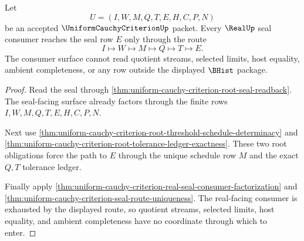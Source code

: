 \begin{theorem}
\label{thm:uniform-cauchy-criterion-root-seal-consumer-nonescape}
Let
$$
U=(I,W,M,Q,T,E,H,C,P,N)
$$
be an accepted $\UniformCauchyCriterionUp$ packet. Every $\RealUp$ seal consumer reaches the seal row $E$ only through the route
$$
I \longmapsto W \longmapsto M \longmapsto Q \longmapsto T \longmapsto E.
$$
The consumer surface cannot read quotient streams, selected limits, host equality, ambient completeness, or any row outside the displayed $\BHist$ package.
\end{theorem}
\begin{proof}
Read the seal through \autoref{thm:uniform-cauchy-criterion-root-seal-readback}. The seal-facing surface already factors through the finite rows $I,W,M,Q,T,E,H,C,P,N$.

Next use \autoref{thm:uniform-cauchy-criterion-root-threshold-schedule-determinacy} and \autoref{thm:uniform-cauchy-criterion-root-tolerance-ledger-exactness}. These two root obligations force the path to $E$ through the unique schedule row $M$ and the exact $Q,T$ tolerance ledger.

Finally apply \autoref{thm:uniform-cauchy-criterion-real-seal-consumer-factorization} and \autoref{thm:uniform-cauchy-criterion-seal-route-uniqueness}. The real-facing consumer is exhausted by the displayed route, so quotient streams, selected limits, host equality, and ambient completeness have no coordinate through which to enter.
\end{proof}

